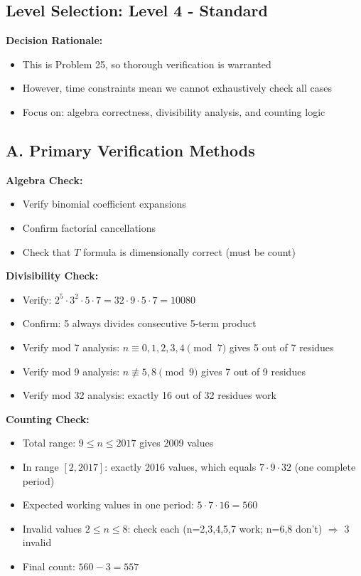 \documentclass[]{article}
\begin{document}
	\begin{verificationbox}
		\subsection*{Level Selection: Level 4 - Standard}
		
		\textbf{Decision Rationale:}
		\begin{itemize}[nosep]
			\item This is Problem 25, so thorough verification is warranted
			\item However, time constraints mean we cannot exhaustively check all cases
			\item Focus on: algebra correctness, divisibility analysis, and counting logic
		\end{itemize}
		
		\subsection*{A. Primary Verification Methods}
		
		\textbf{Algebra Check:}
		\begin{itemize}[nosep]
			\item Verify binomial coefficient expansions
			\item Confirm factorial cancellations
			\item Check that $T$ formula is dimensionally correct (must be count)
		\end{itemize}
		
		\textbf{Divisibility Check:}
		\begin{itemize}[nosep]
			\item Verify: $2^5 \cdot 3^2 \cdot 5 \cdot 7 = 32 \cdot 9 \cdot 5 \cdot 7 = 10080$
			\item Confirm: 5 always divides consecutive 5-term product
			\item Verify mod 7 analysis: $n \equiv 0,1,2,3,4 \pmod{7}$ gives 5 out of 7 residues
			\item Verify mod 9 analysis: $n \not\equiv 5, 8 \pmod{9}$ gives 7 out of 9 residues
			\item Verify mod 32 analysis: exactly 16 out of 32 residues work
		\end{itemize}
		
		\textbf{Counting Check:}
		\begin{itemize}[nosep]
			\item Total range: $9 \leq n \leq 2017$ gives 2009 values
			\item In range $[2, 2017]$: exactly 2016 values, which equals $7 \cdot 9 \cdot 32$ (one complete period)
			\item Expected working values in one period: $5 \cdot 7 \cdot 16 = 560$
			\item Invalid values $2 \leq n \leq 8$: check each (n=2,3,4,5,7 work; n=6,8 don't) $\Rightarrow$ 3 invalid
			\item Final count: $560 - 3 = 557$
		\end{itemize}
		

\end{verificationbox}
\end{document}
